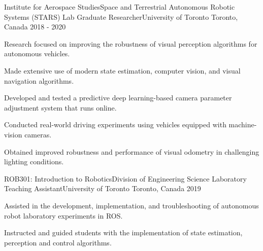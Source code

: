 

\begin{cventries}

  \cventry
    {Institute for Aerospace Studies{\enskip\cdotp\enskip}Space and Terrestrial Autonomous Robotic Systems (STARS) Lab} %
    {Graduate Researcher{\enskip\cdotp\enskip}University of Toronto} %
    {Toronto, Canada} %
    {2018 - 2020} %
    {
      \begin{cvitems} %
        \item {Research focused on improving the robustness of visual perception algorithms for autonomous vehicles.}
        \item {Made extensive use of modern state estimation, computer vision, and visual navigation algorithms.}
        \item {Developed and tested a predictive deep learning-based camera parameter adjustment system that runs online.}
        \item {Conducted real-world driving experiments using vehicles equipped with machine-vision cameras.}
        \item {Obtained improved robustness and performance of visual odometry in challenging lighting conditions.}
      \end{cvitems}
    }
    
  \cventry
    {ROB301: Introduction to Robotics{\enskip\cdotp\enskip}Division of Engineering Science} %
    {Laboratory Teaching Assistant{\enskip\cdotp\enskip}University of Toronto} %
    {Toronto, Canada} %
    {2019} %
    {
      \begin{cvitems} %
        \item {Assisted in the development, implementation, and troubleshooting of autonomous robot laboratory experiments in ROS.}
        \item {Instructed and guided students with the implementation of state estimation, perception and control algorithms.}
      \end{cvitems}
    }
    

\end{cventries}
